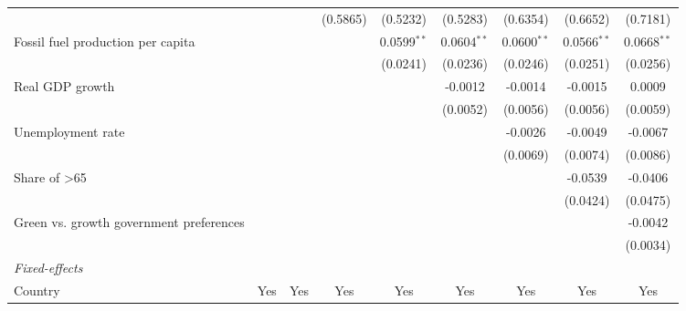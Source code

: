 \begin{table}[htbp]
\begin{tabular}{lcccccccc}
                                                                &                &          & (0.5865) & (0.5232)      & (0.5283)      & (0.6354)      & (0.6652)      & (0.7181)\\   
      Fossil fuel production per capita                         &                &          &          & 0.0599$^{**}$ & 0.0604$^{**}$ & 0.0600$^{**}$ & 0.0566$^{**}$ & 0.0668$^{**}$\\   
                                                                &                &          &          & (0.0241)      & (0.0236)      & (0.0246)      & (0.0251)      & (0.0256)\\   
      Real GDP growth                                           &                &          &          &               & -0.0012       & -0.0014       & -0.0015       & 0.0009\\   
                                                                &                &          &          &               & (0.0052)      & (0.0056)      & (0.0056)      & (0.0059)\\   
      Unemployment rate                                         &                &          &          &               &               & -0.0026       & -0.0049       & -0.0067\\   
                                                                &                &          &          &               &               & (0.0069)      & (0.0074)      & (0.0086)\\   
      Share of >65                                              &                &          &          &               &               &               & -0.0539       & -0.0406\\   
                                                                &                &          &          &               &               &               & (0.0424)      & (0.0475)\\   
      Green vs. growth government preferences                   &                &          &          &               &               &               &               & -0.0042\\   
                                                                &                &          &          &               &               &               &               & (0.0034)\\   
      \midrule
      \emph{Fixed-effects}\\
      Country                                                   & Yes            & Yes      & Yes      & Yes           & Yes           & Yes           & Yes           & Yes\\  

\end{tabular}
\end{table}
